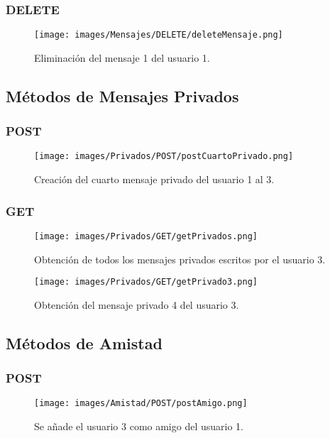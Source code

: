 \documentclass[12pt,a4paper, spanish]{article}
\begin{document}
\subsubsection{DELETE}
\begin{figure}[H]
	\centering
	\texttt{[image: images/Mensajes/DELETE/deleteMensaje.png]}
	\caption{Eliminación del mensaje 1 del usuario 1.}
\end{figure}
\newpage

\subsection{Métodos de Mensajes Privados}
\subsubsection{POST}
\begin{figure}[H]
	\centering
	\texttt{[image: images/Privados/POST/postCuartoPrivado.png]}
	\caption{Creación del cuarto mensaje privado del usuario 1 al 3.}
\end{figure}

\subsubsection{GET}
\begin{figure}[H]
	\centering
	\texttt{[image: images/Privados/GET/getPrivados.png]}
	\caption{Obtención de todos los mensajes privados escritos por el usuario 3.}
\end{figure}

\begin{figure}[H]
	\centering
	\texttt{[image: images/Privados/GET/getPrivado3.png]}
	\caption{Obtención del mensaje privado 4 del usuario 3.}
\end{figure}

\newpage
\subsection{Métodos de Amistad}
\subsubsection{POST}
\begin{figure}[H]
	\centering
	\texttt{[image: images/Amistad/POST/postAmigo.png]}
	\caption{Se añade el usuario 3 como amigo del usuario 1.}
\end{figure}
\end{document}
